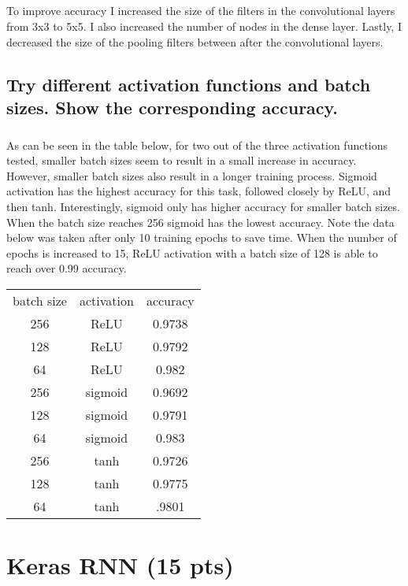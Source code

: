 \documentclass[11pt]{article}
\begin{document}
\subparagraph{}

To improve accuracy I increased the size of the filters in the convolutional layers from 3x3 to 5x5. I also increased the number of nodes in the dense layer. Lastly, I decreased the size of the pooling filters between after the convolutional layers.

\subsection{Try different activation functions and batch sizes. Show the corresponding accuracy.}

\subparagraph{}

As can be seen in the table below, for two out of the three activation functions tested, smaller batch sizes seem to result in a small increase in accuracy. However, smaller batch sizes also result in a longer training process. Sigmoid activation has the highest accuracy for this task, followed closely by ReLU, and then tanh. Interestingly, sigmoid only has higher accuracy for smaller batch sizes. When the batch size reaches 256 sigmoid has the lowest accuracy. Note the data below was taken after only 10 training epochs to save time. When the number of epochs is increased to 15, ReLU activation with a batch size of 128 is able to reach over 0.99 accuracy. 

\begin{center}
\begin{tabular}{ |c|c|c| }
	\hline
	batch size & activation & accuracy \\
	256 & ReLU & 0.9738 \\
	128 & ReLU & 0.9792 \\
	64 & ReLU & 0.982 \\
	\hline
	256 & sigmoid & 0.9692 \\
	128 & sigmoid & 0.9791 \\
	64 & sigmoid & 0.983 \\
	\hline
	256 & tanh & 0.9726 \\
	128 & tanh & 0.9775 \\
	64 & tanh & .9801 \\
	\hline
\end{tabular}
\end{center}

\section{Keras RNN (15 pts)}
\end{document}
